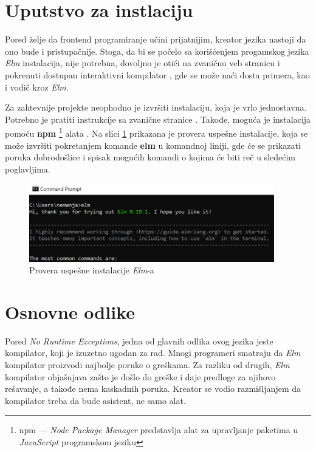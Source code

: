 \documentclass[12pt,oneside]{memoir}
\begin{document}
\section{Uputstvo za instlaciju}
Pored želje da frontend programiranje učini prijatnijim, kreator jezika nastoji 
da ono bude i pristupačnije. Stoga, da bi se počelo sa korišćenjem progamskog jezika \emph{Elm} instalacija,
nije potrebna, dovoljno je otići na zvaničnu veb stranicu i pokrenuti dostupan 
interaktivni kompilator \cite{tryelm}, gde se može naći dosta primera, kao i vodič kroz \emph{Elm}.

Za zahtevnije projekte neophodno je izvršiti instalaciju, koja je vrlo
jednostavna. Potrebno je pratiti instrukcije sa zvanične stranice
\cite{installelm}. Takođe, moguća je instalacija pomoću \textbf{npm}
\footnote{npm --- \emph{Node Package Manager} predstavlja alat za upravljanje paketima u 
\emph{JavaScript} programskom jeziku} alata \cite{npm}.
Na slici \ref{fig:elm-cmd} prikazana je provera uspešne instalacije, koja se može izvršiti
pokretanjem komande \textbf{elm} u komandnoj liniji, gde će se prikazati poruka
dobrodošlice i spisak mogućih komandi o kojima će biti reč u sledećim poglavljima.
\begin{figure}[!ht]
  \centering
  \includegraphics[width=0.95\textwidth]{elm-cmd.png}
  \caption{Provera uspešne instalacije \emph{Elm}-a}
  \label{fig:elm-cmd}
\end{figure}

\section{Osnovne odlike}
Pored \emph{No Runtime Exceptions}, jedna od glavnih odlika ovog jezika jeste
kompilator, koji je izuzetno ugodan za rad. Mnogi programeri smatraju da \emph{Elm}
kompilator proizvodi najbolje poruke o greškama. Za razliku od drugih, \emph{Elm}
kompilator objašnjava zašto je došlo do greške i daje predloge za njihovo rešavanje,
a takođe nema kaskadnih poruka. Kreator se vodio razmišljanjem da kompilator treba
da bude asistent, ne samo alat.
\end{document}
